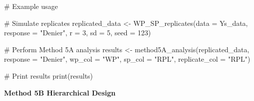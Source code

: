 \documentclass[
  letterpaper,
  DIV=11,
  numbers=noendperiod]{scrartcl}
\newenvironment{Shaded}{\begin{snugshade}}{\end{snugshade}}
\newcommand{\AttributeTok}[1]{\textcolor[rgb]{0.40,0.45,0.13}{#1}}
\newcommand{\CommentTok}[1]{\textcolor[rgb]{0.37,0.37,0.37}{#1}}
\newcommand{\DecValTok}[1]{\textcolor[rgb]{0.68,0.00,0.00}{#1}}
\newcommand{\FunctionTok}[1]{\textcolor[rgb]{0.28,0.35,0.67}{#1}}
\newcommand{\NormalTok}[1]{\textcolor[rgb]{0.00,0.23,0.31}{#1}}
\newcommand{\OtherTok}[1]{\textcolor[rgb]{0.00,0.23,0.31}{#1}}
\newcommand{\StringTok}[1]{\textcolor[rgb]{0.13,0.47,0.30}{#1}}
\begin{document}
\begin{Shaded}
\begin{Highlighting}[]
\CommentTok{\# Example usage}


\CommentTok{\# Simulate replicates}
\NormalTok{replicated\_data }\OtherTok{\textless{}{-}} \FunctionTok{WP\_SP\_replicates}\NormalTok{(}\AttributeTok{data =}\NormalTok{ Ys\_data, }\AttributeTok{response =} \StringTok{"Denier"}\NormalTok{, }\AttributeTok{r =} \DecValTok{3}\NormalTok{, }\AttributeTok{sd =} \DecValTok{5}\NormalTok{, }\AttributeTok{seed =} \DecValTok{123}\NormalTok{)}

\CommentTok{\# Perform Method 5A analysis}
\NormalTok{results }\OtherTok{\textless{}{-}} \FunctionTok{method5A\_analysis}\NormalTok{(replicated\_data, }\AttributeTok{response =} \StringTok{"Denier"}\NormalTok{, }\AttributeTok{wp\_col =} \StringTok{"WP"}\NormalTok{, }\AttributeTok{sp\_col =} \StringTok{"RPL"}\NormalTok{, }\AttributeTok{replicate\_col =} \StringTok{"RPL"}\NormalTok{)}

\CommentTok{\# Print results}
\FunctionTok{print}\NormalTok{(results)}
\end{Highlighting}
\end{Shaded}

\textbf{Method 5B Hierarchical Design}
\end{document}
